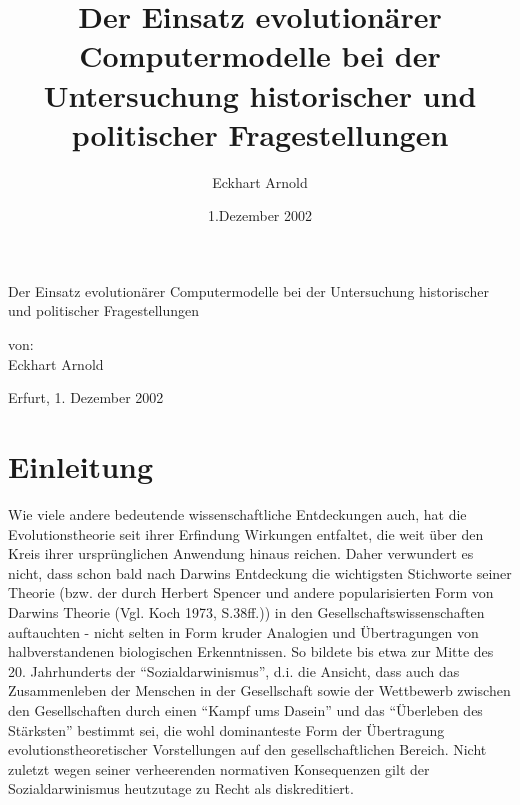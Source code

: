 \documentclass[12pt,a4paper,ngerman]{article}
\begin{document}
\begin{titlepage}

\title{Der Einsatz evolutionärer Computermodelle bei der Untersuchung
  historischer und politischer Fragestellungen}
\author{Eckhart Arnold}
\date{1.Dezember 2002}

\setlength{\parindent}{0em}

\begin{center} {\large Der Einsatz evolutionärer Computermodelle bei der Untersuchung
  historischer und politischer Fragestellungen} \end{center}

\setlength{\parskip}{7cm}

von:\\[0.5cm]Eckhart Arnold\\

\setlength{\parskip}{1cm}

Erfurt, 1. Dezember 2002

\end{titlepage}

 \tableofcontents

\newpage


\setcounter{page}{1}


\section{Einleitung}

Wie viele andere bedeutende wissenschaftliche Entdeckungen auch, hat
die Evolutionstheorie seit ihrer Erfindung Wirkungen entfaltet, die
weit über den Kreis ihrer ursprünglichen Anwendung hinaus reichen. Daher
verwundert es nicht, dass schon bald nach Darwins Entdeckung die
wichtigsten Stichworte seiner Theorie (bzw. der durch Herbert Spencer
und andere popularisierten Form von Darwins Theorie (Vgl. Koch 1973, S.38ff.)) in den
Gesellschaftswissenschaften auftauchten - nicht selten in Form kruder
Analogien und Übertragungen von halbverstandenen biologischen
Erkenntnissen. So bildete bis etwa zur Mitte des
20. Jahrhunderts der "`Sozialdarwinismus"', d.i. die Ansicht,
dass auch das Zusammenleben der Menschen in der Gesellschaft sowie der
Wettbewerb zwischen den Gesellschaften durch einen "`Kampf ums Dasein"'
und das "`Überleben des Stärksten"' bestimmt sei, die wohl dominanteste
Form der Übertragung evolutionstheoretischer Vorstellungen auf den
gesellschaftlichen Bereich. Nicht zuletzt wegen seiner verheerenden
normativen Konsequenzen gilt der Sozialdarwinismus heutzutage zu Recht
als diskreditiert. 
\end{document}
